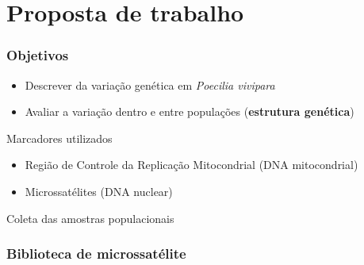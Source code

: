 \documentclass{beamer}
\begin{document}
\section{Proposta de trabalho}
\begin{frame}
  \frametitle{Objetivos}

  \begin{itemize}[<+->]
\item Descrever da variação genética em \textit{Poecilia vivipara}
\item  Avaliar a  variação dentro  e entre populações (\textbf{estrutura genética})
\end{itemize}
\pause
\begin{block}{Marcadores utilizados}
    \begin{itemize}
\item Região de Controle da Replica\c{c}ão Mitocondrial (DNA mitocondrial)
\item Microssatélites (DNA nuclear)
\end{itemize}
 
\end{block}
\end{frame}

\begin{frame}{Coleta das amostras populacionais}
\centering

\end{frame}

\begin{frame}
  \frametitle{Biblioteca de microssatélite}
  \centering
\end{frame}
\end{document}
